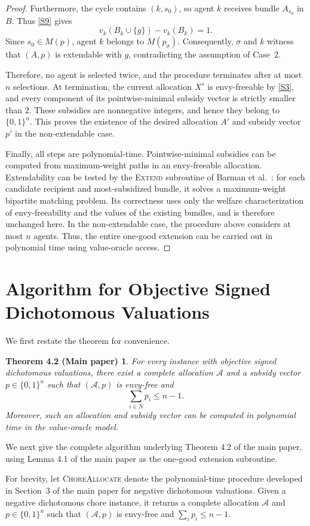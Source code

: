 \documentclass[sigconf,anonymous,nonacm]{aamas}
\newtheorem*{theoremfourtwo}{Theorem 4.2 (Main paper)}
\newcommand{\alloc}{\mathcal{A}}
\begin{document}
\begin{proof}
Furthermore, the cycle contains $(k,s_0)$, so agent $k$ receives bundle $A_{s_0}$ in $B$. Thus \eqref{S9} gives
\[
v_k(B_k\cup\{g\})-v_k(B_k)=1.
\]
Since $s_0\in M(p)$, agent $k$ belongs to $M(p_\sigma)$. Consequently, $\sigma$ and $k$ witness that $(A,p)$ is extendable with $g$, contradicting the assumption of Case~2.

Therefore, no agent is selected twice, and the procedure terminates after at most $n$ selections. At termination, the current allocation $X^s$ is envy-freeable by \eqref{S3}, and every component of its pointwise-minimal subsidy vector is strictly smaller than $2$. These subsidies are nonnegative integers, and hence they belong to $\{0,1\}^n$. This proves the existence of the desired allocation $A'$ and subsidy vector $p'$ in the non-extendable case.

Finally, all steps are polynomial-time. Pointwise-minimal subsidies can be computed from maximum-weight paths in an envy-freeable allocation. Extendability can be tested by the \textsc{Extend} subroutine of Barman et al.~\cite{BKNS22}: for each candidate recipient and most-subsidized bundle, it solves a maximum-weight bipartite matching problem. Its correctness uses only the welfare characterization of envy-freeability and the values of the existing bundles, and is therefore unchanged here. In the non-extendable case, the procedure above considers at most $n$ agents. Thus, the entire one-good extension can be carried out in polynomial time using value-oracle access.
\end{proof}

\section{Algorithm for Objective Signed Dichotomous Valuations}
We first restate the theorem for convenience.
\begin{theoremfourtwo}
For every instance with objective signed dichotomous valuations, there exist a complete allocation $\alloc$ and a subsidy vector $p\in\{0,1\}^n$ such that $(\alloc,p)$ is envy-free and
\[
\sum_{i\in N} p_i\leq n-1.
\]
Moreover, such an allocation and subsidy vector can be computed in
polynomial time in the value-oracle model.
\end{theoremfourtwo}
We next give the complete algorithm underlying Theorem 4.2 of the main paper, using Lemma 4.1 of the main paper as the one-good extension subroutine.

For brevity, let \textsc{ChoreAllocate} denote the polynomial-time procedure developed in Section~3 of the main paper for negative dichotomous valuations. Given a negative dichotomous chore instance, it returns a complete allocation $\alloc$ and $p\in\{0,1\}^n$ such that $(\alloc,p)$ is envy-free and $\sum_i p_i\le n-1$.
\end{document}
